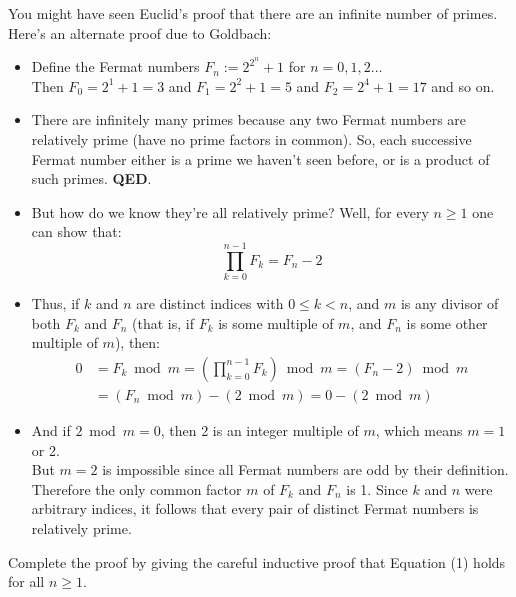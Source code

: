 \documentclass[12pt,letterpaper,boxed,cm]{hmcpset}
\newcommand{\pn}[1]{\left( #1 \right)}
\begin{document}
\begin{problem}[2]
    [4 points] You might have seen Euclid’s proof that there are an infinite number of primes. Here’s an alternate proof due to Goldbach:\\
    \begin{itemize}
        \item[] Define the Fermat numbers $\displaystyle F_n:=2^{2^n}+1$ for $n=0,1,2\ldots$\\ Then $F_0 = 2^1+1 = 3$ and $F_1 = 2^2+1 = 5$ and $F_2 = 2^4+1 = 17$ and so on.

        \item[] There are infinitely many primes because any two Fermat numbers are relatively prime (have no prime factors in common). So, each successive Fermat number either is a prime we haven’t seen before, or is a product of such primes. \textbf{QED}.\\

        \item[] But how do we know they’re all relatively prime? Well, for every $n\ge1$ one can show that:\\
        \begin{equation}
            \prod_{k=0}^{n-1}F_k=F_n-2
        \end{equation}

        \item[] Thus, if $k$ and $n$ are distinct indices with $0 \le k < n$, and $m$ is any divisor of both $F_k$ and $F_n$ (that is, if $F_k$ is some multiple of $m$, and $F_n$ is some other multiple of $m$), then:
        \begin{align*}
            0&=F_k \bmod m = \pn{\prod  _{k=0}^{n-1}F_k} \bmod m =\pn{F_n-2} \bmod m \\
            &= \pn{F_n \bmod m} - \pn{2 \bmod m} = 0 - \pn{2 \bmod m}
        \end{align*}

        \item[] And if $2 \bmod m = 0$, then 2 is an integer multiple of $m$, which means $m=1$ or 2. \\ But $m=2$ is impossible since all Fermat numbers are odd by their definition. Therefore the only common factor $m$ of $F_k$ and $F_n$ is 1. Since $k$ and $n$ were arbitrary indices, it follows that every pair of distinct Fermat numbers is relatively prime.
    \end{itemize}
    Complete the proof by giving the careful inductive proof that Equation (1) holds for all $n\ge1$.
\end{problem}
\end{document}
